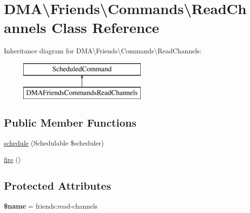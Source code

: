 \hypertarget{classDMA_1_1Friends_1_1Commands_1_1ReadChannels}{}\section{D\+M\+A\textbackslash{}Friends\textbackslash{}Commands\textbackslash{}Read\+Channels Class Reference}
\label{classDMA_1_1Friends_1_1Commands_1_1ReadChannels}
Inheritance diagram for D\+M\+A\textbackslash{}Friends\textbackslash{}Commands\textbackslash{}Read\+Channels\+:\begin{figure}[H]
\begin{center}
\leavevmode
\includegraphics[height=2.000000cm]{d6/d3d/classDMA_1_1Friends_1_1Commands_1_1ReadChannels}
\end{center}
\end{figure}
\subsection*{Public Member Functions}
\begin{DoxyCompactItemize}
\item 
\hyperlink{classDMA_1_1Friends_1_1Commands_1_1ReadChannels_ad59b45e072cbdfee43b099f9606acba6}{schedule} (Schedulable \$scheduler)
\item 
\hyperlink{classDMA_1_1Friends_1_1Commands_1_1ReadChannels_a58b88a3a6874a74c05e11c028462e8a5}{fire} ()
\end{DoxyCompactItemize}
\subsection*{Protected Attributes}
\begin{DoxyCompactItemize}
\item 
\hypertarget{classDMA_1_1Friends_1_1Commands_1_1ReadChannels_a2d450c7a91b98117ea2a083ca28ea761}{}{\bfseries \$name} = \textquotesingle{}friends\+:read-\/channels\textquotesingle{}\label{classDMA_1_1Friends_1_1Commands_1_1ReadChannels_a2d450c7a91b98117ea2a083ca28ea761}

\end{DoxyCompactItemize}


